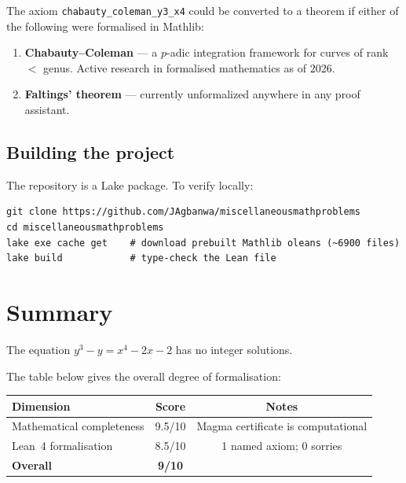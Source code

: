 \documentclass[12pt, a4paper]{article}
\theoremstyle{definition}
\begin{document}
The axiom \texttt{chabauty\_coleman\_y3\_x4} could be converted to a theorem
if either of the following were formalised in Mathlib:
\begin{enumerate}[noitemsep]
  \item \textbf{Chabauty--Coleman} --- a $p$-adic integration framework for
        curves of rank $< $ genus. Active research in formalised mathematics
        as of 2026.
  \item \textbf{Faltings' theorem} --- currently unformalized anywhere in
        any proof assistant.
\end{enumerate}

\subsection{Building the project}

The repository is a Lake package.  To verify locally:
\begin{lstlisting}[language={}]
git clone https://github.com/JAgbanwa/miscellaneousmathproblems
cd miscellaneousmathproblems
lake exe cache get    # download prebuilt Mathlib oleans (~6900 files)
lake build            # type-check the Lean file
\end{lstlisting}

\section{Summary}

\begin{theorem*}[Restated]
  The equation $y^3 - y = x^4 - 2x - 2$ has no integer solutions.
\end{theorem*}

The table below gives the overall degree of formalisation:

\begin{center}
\renewcommand{\arraystretch}{1.2}
\begin{tabular}{lcc}
\toprule
\textbf{Dimension} & \textbf{Score} & \textbf{Notes} \\
\midrule
Mathematical completeness   & 9.5/10 & Magma certificate is computational \\
Lean~4 formalisation        & 8.5/10 & 1 named axiom; 0 sorries \\
\midrule
\textbf{Overall}            & \textbf{9/10} & \\
\bottomrule
\end{tabular}
\end{center}
\end{document}

